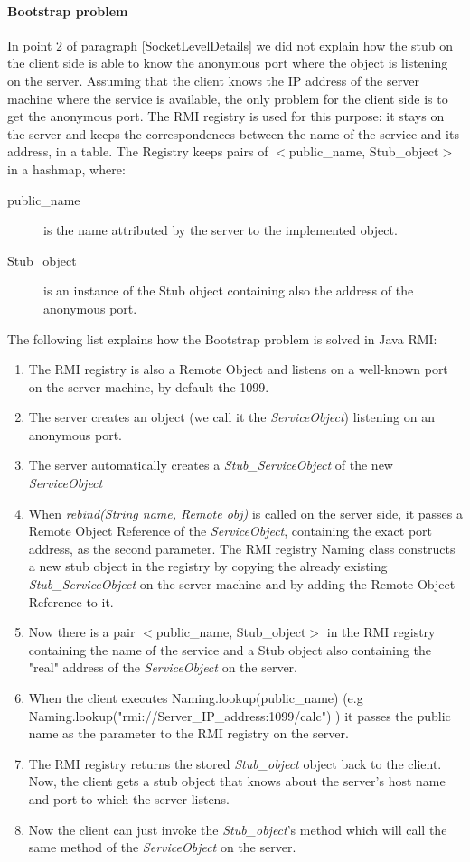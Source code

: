 \paragraph{Bootstrap problem}
\label{BootstrapProblem}
In point 2 of paragraph \ref{SocketLevelDetails} we did not explain how the stub on the client side is able to know the anonymous port where the object is listening on the server. Assuming that the client knows the IP address of the server machine where the service is available, the only problem for the client side is to get the anonymous port.
The RMI registry is used for this purpose: it stays on the server and keeps the correspondences between the name of the service and its address, in a table.
The Registry keeps pairs of $<$public\_name, Stub\_object$>$ in a hashmap, where:
\begin{description}
\item [public\_name] is the name attributed by the server to the implemented object.
\item [Stub\_object] is an instance of the Stub object containing also the address of the anonymous port. 
\end{description}

The following list explains how the Bootstrap problem is solved in Java RMI:
\begin{enumerate}
\item The RMI registry is also a Remote Object and listens on a well-known port on the server machine, by default the 1099.
\item The server creates an object (we call it the \textit{ServiceObject}) listening on an anonymous port.
\item The server automatically creates a \textit{Stub\_ServiceObject} of the new \textit{ServiceObject}
\item When \textit{rebind(String name, Remote obj)} is called on the server side, it passes a Remote Object Reference of the \textit{ServiceObject}, containing the exact port address, as the second parameter. The RMI registry Naming class constructs a new stub object in the registry by copying the already existing \textit{Stub\_ServiceObject} on the server machine and by adding the Remote Object Reference to it.
\item Now there is a pair $<$public\_name, Stub\_object$>$ in the RMI registry containing the name of the service and a Stub object also containing the "real" address of the \textit{ServiceObject} on the server.
\item When the client executes Naming.lookup(public\_name) (e.g \\ Naming.lookup("rmi://Server\_IP\_address:1099/calc") ) it passes the public name as the parameter to the RMI registry on the server. 
\item The RMI registry returns the stored \textit{Stub\_object} object back to the client. Now, the client gets a stub object that knows about the server's host name and port to which the server listens.
\item Now the client can just invoke the \textit{Stub\_object}'s method which will call the same method of the \textit{ServiceObject} on the server.
\end{enumerate}

